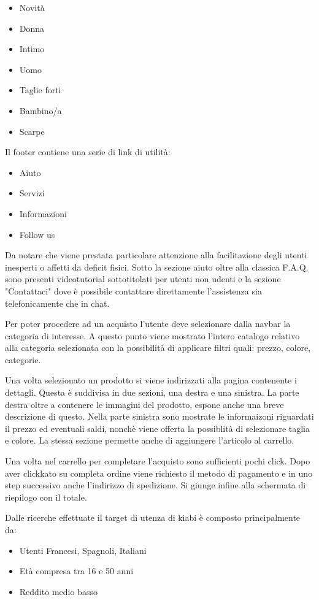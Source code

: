 \documentclass[12pt,italian,]{report}
\begin{document}
\begin{itemize}
\item Novità
\item Donna
\item Intimo
\item Uomo
\item Taglie forti
\item Bambino/a
\item Scarpe
\end{itemize}

Il footer contiene una serie di link di utilità:

\begin{itemize}
\item Aiuto
\item Servizi
\item Informazioni
\item Follow us
\end{itemize}

Da notare che viene prestata particolare attenzione alla facilitazione degli utenti inesperti o affetti da deficit fisici. Sotto la sezione aiuto oltre alla classica F.A.Q. sono presenti videotutorial sottotitolati per utenti non udenti e la sezione "Contattaci" dove è possibile contattare direttamente l'assistenza sia telefonicamente che in chat.

Per poter procedere ad un acquisto l'utente deve selezionare dalla navbar la categoria di interesse.
A questo punto viene mostrato l'intero catalogo relativo alla categoria selezionata con la possibilità di applicare filtri quali: prezzo, colore, categorie.

Una volta selezionato un prodotto si viene indirizzati alla pagina contenente i dettagli. Questa è suddivisa in due sezioni, una destra e una sinistra.
La parte destra oltre a contenere le immagini del prodotto, espone anche una breve descrizione di questo. 
Nella parte sinistra sono mostrate le informaizoni riguardati il prezzo ed eventuali saldi, nonchè viene offerta la possiblità di selezionare taglia e colore. La stessa sezione permette anche di aggiungere l'articolo al carrello.

Una volta nel carrello per completare l'acquisto sono sufficienti pochi click. Dopo aver clickkato su completa ordine viene richiesto il metodo di pagamento e in uno step successivo anche l'indirizzo di spedizione. Si giunge infine alla schermata di riepilogo con il totale.


Dalle ricerche effettuate il target di utenza di kiabi è composto principalmente da:
\begin{itemize}
    \item Utenti Francesi, Spagnoli, Italiani
    \item Età compresa tra 16 e 50 anni
    \item Reddito medio basso
\end{itemize}
\end{document}
